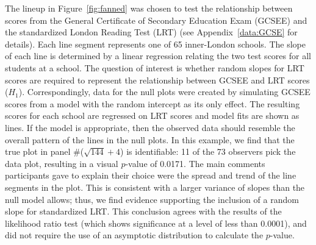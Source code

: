 \documentclass[12pt]{article} %
\newcommand{\hh}[1]{{\color{orange} #1}}
\newcommand{\al}[1]{{\color{ForestGreen} #1}}
\newcommand{\alnote}[1]{\todo[inline,color=green!40]{#1}} %
\begin{document}
The lineup in Figure~\ref{fig:fanned} was chosen to test the relationship between scores from the General Certificate of Secondary Education Exam (GCSEE) and the  standardized London Reading Test (LRT) (see Appendix~\ref{data:GCSE} for details).  Each line segment represents one of 65 inner-London schools. The slope of each line is determined by a linear regression relating the two test scores for all students at a school. 
The question of interest is whether random slopes for LRT scores are required to  represent the relationship between GCSEE and LRT scores ($H_1$). Correspondingly, data for the null plots  were  created by simulating GCSEE scores from a model with the random intercept as its only effect.
The resulting scores for each school are regressed on LRT scores and model fits are shown as lines.
 If the model is appropriate, then    the observed data should resemble the overall pattern of the lines in the null plots. In this example, we find that the true plot in panel \#($\sqrt{144} + 4$) is identifiable:  11 of the 73 observers pick the data plot, resulting in a visual $p$-value of 0.0171. The main comments participants gave to explain their choice were the spread and trend of the line segments in the plot. This is consistent with a larger variance of slopes than the null model allows;
  thus, we find evidence supporting the inclusion of a random slope for standardized LRT. This conclusion agrees with the results of the likelihood ratio test (which shows significance at a level of less than 0.0001), and did not require the use of an asymptotic distribution to calculate the $p$-value. 
  
\end{document}
